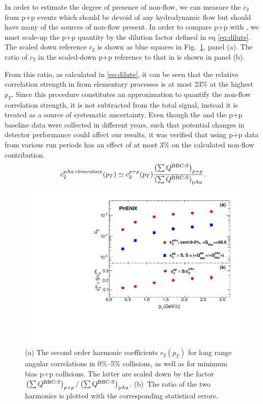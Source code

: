 In order to estimate the degree of presence of non-flow, we can measure the $c_2$ from p+p events which should be devoid of any hydrodynamic flow but should have many of the sources of non-flow present. In order to compare p+p with \pau, we must scale-up the p+p quantity by the dilution factor defined in eq \ref{eq:dilute}.
The scaled down reference $c_{2}$ is shown as blue squares in Fig.~\ref{fig:non_flow}, panel (a). The ratio of $c_2$ in the scaled-down p+p reference to that in \pau is shown in panel (b). 

From this ratio, as calculated in \ref{eq:dilute}, it can be seen that the relative correlation strength in \pau from elementary processes is at most 23$\%$ at the highest $p_T$. Since this procedure constitutes an approximation to quantify the non-flow correlation strength, it is not subtracted from the total signal, instead it is treated as a source of systematic uncertainty. Even though the \pau and the p+p baseline data were collected in different years, such that potential changes in detector performance could affect our results, it was verified that using p+p data from various run periods has an effect of at most 3$\%$ on the calculated non-flow contribution.
\begin{equation}
c_{2}^{{\rm pAu \; elementary}}(p_{T}) \simeq c_{2}^{p+p}(p_{T})
\frac{\left( \sum Q^{{\rm \text{BBC-S}}} \right)_{p+p}}
{\left( \sum Q^{{\rm \text{BBC-S}}} \right)_{{\rm pAu}}
}.
\label{eq:dilute}
\end{equation}

\begin{figure}[!h]
\begin{center}
\includegraphics[width=0.6\linewidth]{figs/non_flow.pdf}
\caption{(a) The second order harmonic coefficients $c_2(p_T)$ for long range angular correlations in
0\%--5\% \pau collisions, as well as for minimum bias p+p collisions. The latter are scaled down by the factor $\left( \sum Q^{{\rm \text{BBC-S}}} \right)_{p+p} / \left( \sum Q^{{\rm
\text{BBC-S}}} \right)_{{\rm pAu}}$. (b)~The
ratio of the two harmonics is plotted with the corresponding statistical errors.}
\label{fig:non_flow}
\end{center}
\end{figure}


